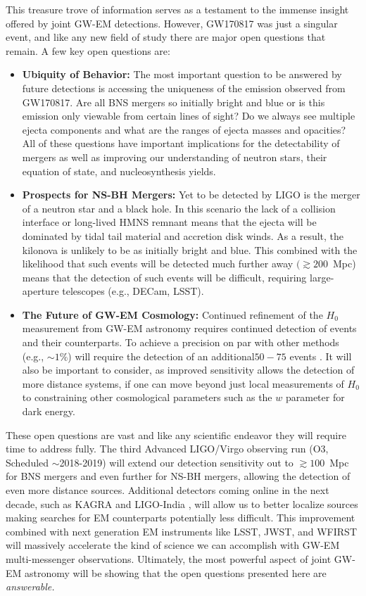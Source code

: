 This treasure trove of information serves as a testament to the immense insight offered by joint GW-EM detections. However, GW170817 was just a singular event, and like any new field of study there are major open questions that remain. A few key open questions are:
\begin{itemize}
\item {\bf Ubiquity of Behavior:} The most important question to be answered by future detections is accessing the uniqueness of the emission observed from GW170817. Are all BNS mergers so initially bright and blue or is this emission only viewable from certain lines of sight? Do we always see multiple ejecta components and what are the ranges of ejecta masses and opacities? All of these questions have important implications for the detectability of mergers as well as improving our understanding of neutron stars, their equation of state, and nucleosynthesis yields.
\item {\bf Prospects for NS-BH Mergers:} Yet to be detected by LIGO is the merger of a neutron star and a black hole. In this scenario the lack of a collision interface or long-lived HMNS remnant means that the ejecta will be dominated by tidal tail material and accretion disk winds. As a result, the kilonova is unlikely to be as initially bright and blue. This combined with the likelihood that such events will be detected much further away $(\gtrsim 200$~Mpc) means that the detection of such events will be difficult, requiring large-aperture telescopes (e.g., DECam, LSST).
\item {\bf The Future of GW-EM Cosmology:} Continued refinement of the $H_0$ measurement from GW-EM astronomy requires continued detection of events and their counterparts. To achieve a precision on par with other methods (e.g., $\sim1\%$) will require the detection of an additional$50-75$ events \citep{Guidorzi+17}. It will also be important to consider, as improved sensitivity allows the detection of more distance systems, if one can move beyond just local measurements of $H_0$ to constraining other cosmological parameters such as the $w$ parameter for dark energy. 
\end{itemize}

These open questions are vast and like any scientific endeavor they will require time to address fully. The third Advanced LIGO/Virgo observing run (O3, Scheduled $\sim$2018-2019) will extend our detection sensitivity out to $\gtrsim100$~Mpc for BNS mergers and even further for NS-BH mergers, allowing the detection of even more distance sources. Additional detectors coming online in the next decade, such as KAGRA \citep{KAGRA} and LIGO-India \citep{LIGOIndia}, will allow us to better localize sources making searches for EM counterparts potentially less difficult. This improvement combined with next generation EM instruments like LSST, JWST, and WFIRST will massively accelerate the kind of science we can accomplish with GW-EM multi-messenger observations. Ultimately, the most powerful aspect of joint GW-EM astronomy will be showing that the open questions presented here are {\it answerable.}

